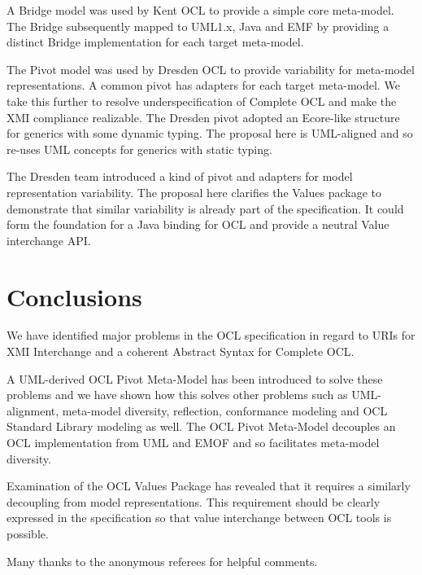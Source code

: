 \documentclass{eceasst}
\begin{document}
A Bridge model was used by Kent OCL \cite{Bridge} to provide a simple core meta-model. The Bridge subsequently mapped to UML1.x, Java and EMF by providing a distinct Bridge implementation for each target meta-model.

The Pivot model was used by Dresden OCL\cite{Pivot} to provide variability for meta-model representations. A common pivot has adapters for each target meta-model. We take this further to resolve underspecification of Complete OCL and make the XMI compliance realizable. The Dresden pivot adopted an Ecore-like structure for generics with some dynamic typing. The proposal here is UML-aligned and so re-uses UML concepts for generics with static typing. 

The Dresden team\cite{Variability} introduced a kind of pivot and adapters for model representation variability. The proposal here clarifies the Values package to demonstrate that similar variability is already part of the specification. It could form the foundation for a Java binding for OCL and provide a neutral Value interchange API.

\section{Conclusions}

We have identified major problems in the OCL specification in regard to URIs for XMI Interchange and a coherent Abstract Syntax for Complete OCL.

A UML-derived OCL Pivot Meta-Model has been introduced to solve these problems and we have shown how this solves other problems such as UML-alignment, meta-model diversity, reflection, conformance modeling and OCL Standard Library modeling as well. The OCL Pivot Meta-Model decouples an OCL implementation from UML and EMOF and so facilitates meta-model diversity.

Examination of the OCL Values Package has revealed that it requires a similarly decoupling from model representations. This requirement should be clearly expressed in the specification so that value interchange between OCL tools is possible. 

Many thanks to the anonymous referees for helpful comments.

\nocite{*}


\end{document}
